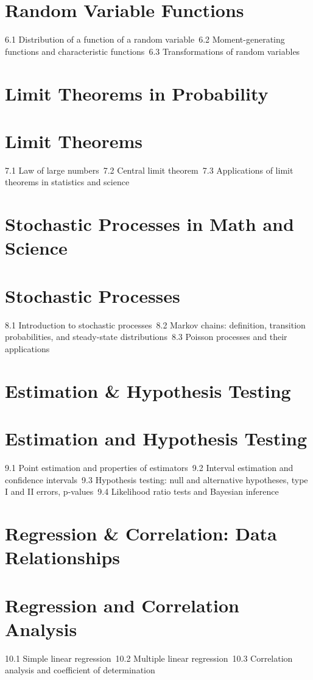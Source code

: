\section{Random Variable Functions}
6.1 Distribution of a function of a random variable\
6.2 Moment-generating functions and characteristic functions\
6.3 Transformations of random variables\
\section{Limit Theorems in Probability}
\section{Limit Theorems}
7.1 Law of large numbers\
7.2 Central limit theorem\
7.3 Applications of limit theorems in statistics and science\
\section{Stochastic Processes in Math and Science}
\section{Stochastic Processes}
8.1 Introduction to stochastic processes\
8.2 Markov chains: definition, transition probabilities, and steady-state distributions\
8.3 Poisson processes and their applications\
\section{Estimation \& Hypothesis Testing}
\section{Estimation and Hypothesis Testing}
9.1 Point estimation and properties of estimators\
9.2 Interval estimation and confidence intervals\
9.3 Hypothesis testing: null and alternative hypotheses, type I and II errors, p-values\
9.4 Likelihood ratio tests and Bayesian inference\
\section{Regression \& Correlation: Data Relationships}
\section{Regression and Correlation Analysis}
10.1 Simple linear regression\
10.2 Multiple linear regression\
10.3 Correlation analysis and coefficient of determination\
